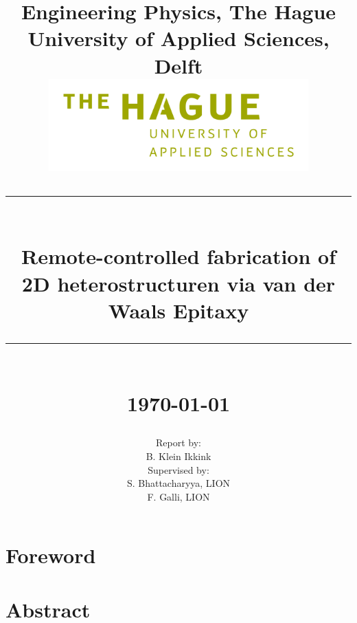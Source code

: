 \documentclass[11pt]{article}
\newcommand{\HRule}[1]{\rule{\linewidth}{#1}}
\begin{document}
\date{}

\title{ \normalsize Engineering Physics, The Hague University of Applied Sciences, Delft
		\\ [1.0cm]
		\includegraphics[width=100mm]{img/cover/hhs_en_groen_hex.png}  %
		\HRule{2pt} \\
		\LARGE \textbf{Remote-controlled fabrication of 2D heterostructuren via van der Waals Epitaxy} %
		\HRule{2pt} \\ [0.5cm]
		\normalsize \today \vspace*{5\baselineskip}}
		
\date{}

\author{
        Report by:\\[0.5cm]
		B. Klein Ikkink            \\[1cm]
		 Supervised by:        \\
		 S. Bhattacharyya, LION \\
		 F. Galli, LION \\
		 }
		 
\maketitle

\clearpage
\section*{Foreword}
\clearpage

\section*{Abstract}
\clearpage
\end{document}
